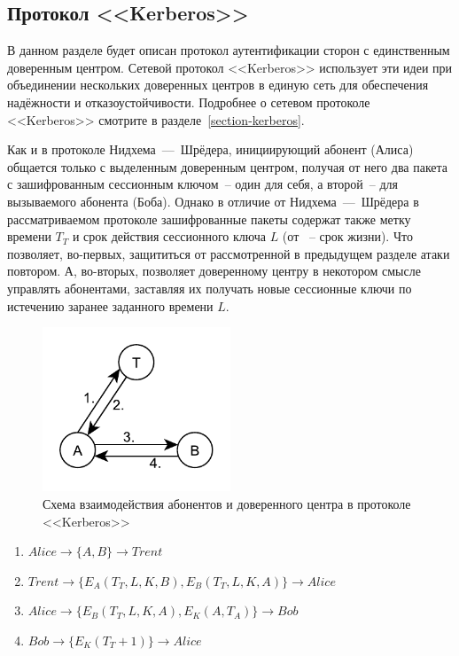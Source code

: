 \subsection{Протокол <<Kerberos>>}

В данном разделе будет описан протокол аутентификации сторон с единственным доверенным центром. Сетевой протокол <<Kerberos>> использует эти идеи при объединении нескольких доверенных центров в единую сеть для обеспечения надёжности и отказоустойчивости. Подробнее о сетевом протоколе <<Kerberos>> смотрите в разделе~\ref{section-kerberos}.

Как и в протоколе Нидхема~---~Шрёдера, инициирующий абонент (Алиса) общается только с выделенным доверенным центром, получая от него два пакета с зашифрованным сессионным ключом~-- один для себя, а второй~-- для вызываемого абонента (Боба). Однако в отличие от Нидхема~---~Шрёдера в рассматриваемом протоколе зашифрованные пакеты содержат также метку времени $T_T$ и срок действия сессионного ключа $L$ (от ~-- срок жизни). Что позволяет, во-первых, защититься от рассмотренной в предыдущем разделе атаки повтором. А, во-вторых, позволяет доверенному центру в некотором смысле управлять абонентами, заставляя их получать новые сессионные ключи по истечению заранее заданного времени $L$.

\begin{figure}[!htb]
    \centering
    \includegraphics[width=0.5\textwidth]{pic/key_distribution-kerberos}
    \caption{Схема взаимодействия абонентов и доверенного центра в протоколе <<Kerberos>>\label{fig:key_distribution-kerberos}}
\end{figure}

\begin{enumerate}
	\item $ Alice	\rightarrow \{ A, B \}									\rightarrow Trent $
	\item $ Trent	\rightarrow \{ E_A \left( T_T, L, K, B \right), E_B \left( T_T, L, K, A \right) \}	\rightarrow Alice $
	\item $ Alice	\rightarrow \{ E_B \left( T_T, L, K, A \right), E_K \left( A, T_A \right) \}		\rightarrow Bob $
	\item $ Bob	\rightarrow \{ E_K \left( T_T + 1 \right) \}						\rightarrow Alice $
\end{enumerate}

